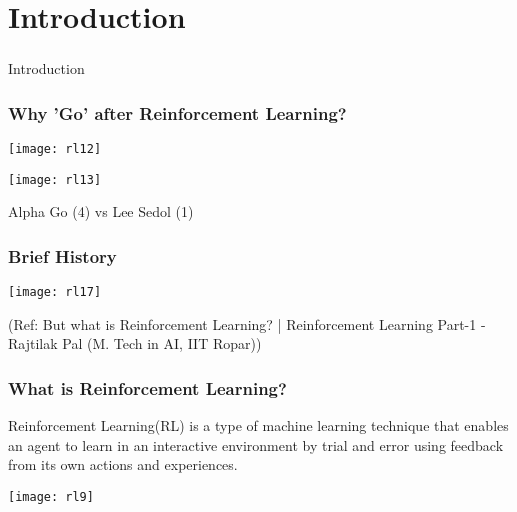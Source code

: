 \section[Intro]{Introduction}

\begin{frame}[fragile]\frametitle{}
\begin{center}
{\Large Introduction}
\end{center}
\end{frame}

\begin{frame}[fragile]\frametitle{Why 'Go' after Reinforcement Learning?}

\begin{center}
\texttt{[image: rl12]}

\texttt{[image: rl13]}

Alpha Go (4) vs Lee Sedol (1)
\end{center}

\end{frame}

\begin{frame}[fragile]\frametitle{Brief History}

\begin{center}
\texttt{[image: rl17]}
\end{center}

{\tiny (Ref: But what is Reinforcement Learning? | Reinforcement Learning Part-1 - Rajtilak Pal (M. Tech in AI, IIT Ropar))}
\end{frame}


\begin{frame}[fragile]\frametitle{What is Reinforcement Learning?}
Reinforcement Learning(RL) is a type of machine learning technique that enables an agent to learn in an interactive environment by trial and error using feedback from its own actions and experiences.

\begin{center}
\texttt{[image: rl9]}
\end{center}


\end{frame}

